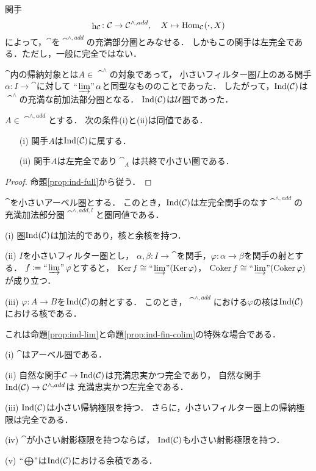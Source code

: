 関手
\begin{equation*}
    \mathop{\mathrm{h}}\nolimits_{\mathcal{C}}\colon\mathcal{C}\to\mathcal{C}^{\wedge,add},\quad X\mapsto\mathop{\mathrm{Hom}}\nolimits_{\mathcal{C}}(\boldsymbol{\cdot},X)
\end{equation*}
によって，$\cat$を$\cat^{\wedge,add}$の充満部分圏とみなせる．
しかもこの関手は左完全である．ただし，一般に完全ではない．

$\cat$内の帰納対象とは$A\in\cat^\wedge$の対象であって，
小さいフィルター圏$I$上のある関手$\alpha\colon I\to\cat$に対して
$\mathop{\text{``}\hspace{-0.7pt}\varinjlim\hspace{-1.5pt}\text{''}}\alpha$と同型なもののことであった．
したがって，$\mathop{\mathrm{Ind}}(\mathcal{C})$は$\cat^\wedge$の充満な前加法部分圏となる．
$\mathop{\mathrm{Ind}}(\mathcal{C})$は$\mathcal{U}$圏であった．

\begin{Proposition}
    $A\in\cat^{\wedge,add}$とする．
    次の条件(i)と(ii)は同値である．
    \begin{enumerate}
        \item [(i)]関手$A$は$\mathop{\mathrm{Ind}}(\mathcal{C})$に属する．
        \item [(ii)]関手$A$は左完全であり$\cat_A$は共終で小さい圏である．
    \end{enumerate}
\end{Proposition}
\begin{proof}
    命題\ref{prop:ind-full}から従う．
\end{proof}

\begin{Corollary}
    $\cat$を小さいアーベル圏とする．
    このとき，$\mathop{\mathrm{Ind}}(\mathcal{C})$は左完全関手のなす$\cat^{\wedge,add}$の
    充満加法部分圏$\cat^{\wedge,add,l}$と圏同値である．
\end{Corollary}

\begin{Lemma}\label{lem:ind-property}
    (i) 
    圏$\mathop{\mathrm{Ind}}(\mathcal{C})$は加法的であり，核と余核を持つ．

    (ii) 
    $I$を小さいフィルター圏とし，
    $\alpha, \beta\colon I\to\cat$を関手，$\varphi\colon\alpha\to\beta$を関手の射とする．
    $f\coloneqq\mathop{\text{``}\hspace{-0.7pt}\varinjlim\hspace{-1.5pt}\text{''}}\varphi$とすると，
    $\mathop{\mathrm{Ker}}\nolimits f\cong\mathop{\text{``}\hspace{-0.7pt}\varinjlim\hspace{-1.5pt}\text{''}}(\mathop{\mathrm{Ker}}\nolimits\varphi)$，
    $\mathop{\mathrm{Coker}}\nolimits f\cong\mathop{\text{``}\hspace{-0.7pt}\varinjlim\hspace{-1.5pt}\text{''}}(\mathop{\mathrm{Coker}}\nolimits\varphi)$が成り立つ．

    (iii) 
    $\varphi\colon A\to B$を$\mathop{\mathrm{Ind}}(\mathcal{C})$の射とする．
    このとき，$\cat^{\wedge,add}$における$\varphi$の核は$\mathop{\mathrm{Ind}}(\mathcal{C})$における核である．
\end{Lemma}

これは命題\ref{prop:ind-lim}と命題\ref{prop:ind-fin-colim}の特殊な場合である．

\begin{Theorem}
    (i) 
    $\cat$はアーベル圏である．

    (ii) 
    自然な関手$\mathcal{C}\to\mathop{\mathrm{Ind}}(\mathcal{C})$は充満忠実かつ完全であり，
    自然な関手$\mathop{\mathrm{Ind}}(\mathcal{C})\to\mathcal{C}^{\wedge,add}$は
    充満忠実かつ左完全である．

    (iii) 
    $\mathop{\mathrm{Ind}}(\mathcal{C})$は小さい帰納極限を持つ．
    さらに，小さいフィルター圏上の帰納極限は完全である．

    (iv) 
    $\cat$が小さい射影極限を持つならば，
    $\mathop{\mathrm{Ind}}(\mathcal{C})$も小さい射影極限を持つ．

    (v) 
    $\ind<\bigoplus>$は$\mathop{\mathrm{Ind}}(\mathcal{C})$における余積である．
\end{Theorem}

